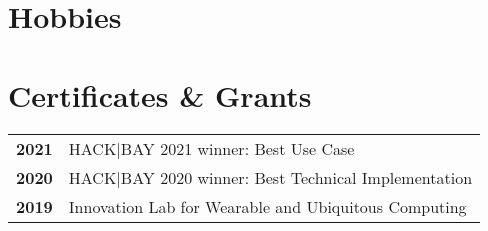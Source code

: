\documentclass[michiscolours]{hipstercv}
\begin{document}
\begin{paracol}{2}
\begin{minipage}[t]{0.16\textwidth}
\section*{Hobbies}
\hfill
{}

 \hfill
{} 

 \hfill
{} 

\end{minipage}

\vspace{4em}

\begin{minipage}[t]{0.3\textwidth}
\section*{Certificates \& Grants}
\begin{tabular}{>{\footnotesize\bfseries}r >{\footnotesize}p{}}
    2021 &  HACK|BAY 2021 winner: Best Use Case \\
    2020 &  {HACK|BAY 2020 winner: \newline Best Technical Implementation} \\
    2019 & Innovation Lab for Wearable and Ubiquitous Computing\\

\end{tabular}
\end{minipage}\hfill
\begin{minipage}[t]{0.3\textwidth}

\end{minipage}
\end{paracol}
\end{document}

